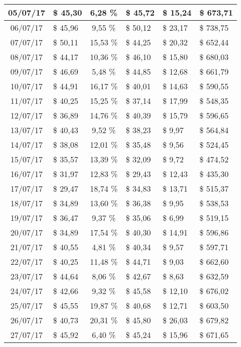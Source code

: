 \begin{center}
\begin{small}
\begin{longtable}{|c|l|c|l|l|l|}
05/07/17 & \$ 45,30 & 6,28 \% & \$ 45,72 & \$ 15,24 & \$ 673,71 \\ \hline
06/07/17 & \$ 45,96 & 9,55 \% & \$ 50,12 & \$ 23,17 & \$ 738,75 \\ \hline
07/07/17 & \$ 50,11 & 15,53 \% & \$ 44,25 & \$ 20,32 & \$ 652,44 \\ \hline
08/07/17 & \$ 44,17 & 10,36 \% & \$ 46,10 & \$ 15,80 & \$ 680,03 \\ \hline
09/07/17 & \$ 46,69 & 5,48 \% & \$ 44,85 & \$ 12,68 & \$ 661,79 \\ \hline
10/07/17 & \$ 44,91 & 16,17 \% & \$ 40,01 & \$ 14,63 & \$ 590,55 \\ \hline
11/07/17 & \$ 40,25 & 15,25 \% & \$ 37,14 & \$ 17,99 & \$ 548,35 \\ \hline
12/07/17 & \$ 36,89 & 14,76 \% & \$ 40,39 & \$ 15,79 & \$ 596,65 \\ \hline
13/07/17 & \$ 40,43 & 9,52 \% & \$ 38,23 & \$ 9,97 & \$ 564,84 \\ \hline
14/07/17 & \$ 38,08 & 12,01 \% & \$ 35,48 & \$ 9,56 & \$ 524,45 \\ \hline
15/07/17 & \$ 35,57 & 13,39 \% & \$ 32,09 & \$ 9,72 & \$ 474,52 \\ \hline
16/07/17 & \$ 31,97 & 12,83 \% & \$ 29,43 & \$ 12,43 & \$ 435,30 \\ \hline
17/07/17 & \$ 29,47 & 18,74 \% & \$ 34,83 & \$ 13,71 & \$ 515,37 \\ \hline
18/07/17 & \$ 34,89 & 13,60 \% & \$ 36,38 & \$ 9,95 & \$ 538,53 \\ \hline
19/07/17 & \$ 36,47 & 9,37 \% & \$ 35,06 & \$ 6,99 & \$ 519,15 \\ \hline
20/07/17 & \$ 34,89 & 17,54 \% & \$ 40,30 & \$ 14,91 & \$ 596,86 \\ \hline
21/07/17 & \$ 40,55 & 4,81 \% & \$ 40,34 & \$ 9,57 & \$ 597,71 \\ \hline
22/07/17 & \$ 40,25 & 11,48 \% & \$ 44,71 & \$ 9,03 & \$ 662,60 \\ \hline
23/07/17 & \$ 44,64 & 8,06 \% & \$ 42,67 & \$ 8,63 & \$ 632,59 \\ \hline
24/07/17 & \$ 42,66 & 9,32 \% & \$ 45,58 & \$ 12,10 & \$ 676,02 \\ \hline
25/07/17 & \$ 45,55 & 19,87 \% & \$ 40,68 & \$ 12,71 & \$ 603,50 \\ \hline
26/07/17 & \$ 40,73 & 20,31 \% & \$ 45,80 & \$ 26,03 & \$ 679,82 \\ \hline
27/07/17 & \$ 45,92 & 6,40 \% & \$ 45,24 & \$ 15,96 & \$ 671,65 \\ \hline

\end{longtable}
\end{small}
\end{center}
